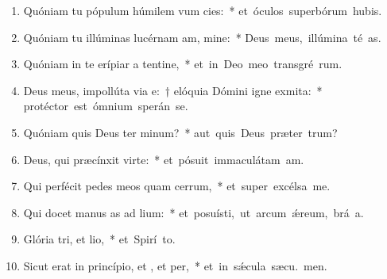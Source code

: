 \begin{flushleft}
\begin{enumerate}[leftmargin=*]
\item Quóniam tu pópulum húmilem vum cies:~* \mbox{et óculos superbórum hubis.}

\item Quóniam tu illúminas lucérnam am, mine:~* \mbox{Deus meus, illúmina té as.}

\item Quóniam in te erípiar a tentine,~* \mbox{et in Deo meo transgré rum.}

\item Deus meus, impollúta via e:~† elóquia Dómini igne exmita:~* \mbox{protéctor est ómnium sperán  se.}

\item Quóniam quis Deus ter minum?~* \mbox{aut quis Deus præter  trum?}

\item Deus, qui præcínxit  virte:~* \mbox{et pósuit immaculátam  am.}

\item Qui perfécit pedes meos quam cerrum,~* \mbox{et super excélsa  me.}

\item Qui docet manus as ad lium:~* \mbox{et posuísti, ut arcum ǽreum, brá a.}


\item Glória tri, et lio,~* \mbox{et Spirí to.}

\item Sicut erat in princípio, et , et per,~* \mbox{et in sǽcula sæcu. men.}

\end{enumerate}
\end{flushleft}

